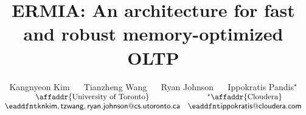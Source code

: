 \documentclass{sig-alternate}
\def\thepapertitle{ERMIA: An architecture for fast and robust memory-optimized OLTP}
\begin{document}
%

\title{\thepapertitle}

\author{
Kangnyeon Kim
~~
Tianzheng Wang
~~
Ryan Johnson
~~
Ippokratis Pandis$^\star$
\bigskip\\
$
\begin{array}{cc}
  \mbox{\affaddr{University of Toronto}} &
  \mbox{$^\star$\affaddr{Cloudera}}\\
  \email{{\large \sf {knkim,tzwang,ryan.johnson}@cs.utoronto.ca}} &
  \email{{\large \sf ippokratis@cloudera.com}}
\end{array}
$
}

\maketitle











{%

}

\end{document}

